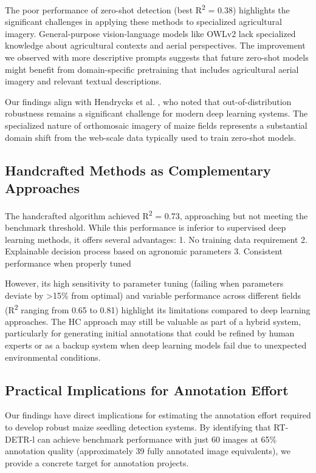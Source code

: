 \documentclass{article}
\begin{document}
The poor performance of zero-shot detection (best R\textsuperscript{2} = 0.38) highlights the significant challenges in applying these methods to specialized agricultural imagery. General-purpose vision-language models like OWLv2 lack specialized knowledge about agricultural contexts and aerial perspectives. The improvement we observed with more descriptive prompts suggests that future zero-shot models might benefit from domain-specific pretraining that includes agricultural aerial imagery and relevant textual descriptions.

Our findings align with Hendrycks et al. \cite{hendrycksManyFacesRobustness2020}, who noted that out-of-distribution robustness remains a significant challenge for modern deep learning systems. The specialized nature of orthomosaic imagery of maize fields represents a substantial domain shift from the web-scale data typically used to train zero-shot models.

\subsection{Handcrafted Methods as Complementary Approaches}

The handcrafted algorithm achieved R\textsuperscript{2} = 0.73, approaching but not meeting the benchmark threshold. While this performance is inferior to supervised deep learning methods, it offers several advantages:
1. No training data requirement
2. Explainable decision process based on agronomic parameters
3. Consistent performance when properly tuned

However, its high sensitivity to parameter tuning (failing when parameters deviate by >15\% from optimal) and variable performance across different fields (R\textsuperscript{2} ranging from 0.65 to 0.81) highlight its limitations compared to deep learning approaches. The HC approach may still be valuable as part of a hybrid system, particularly for generating initial annotations that could be refined by human experts or as a backup system when deep learning models fail due to unexpected environmental conditions.

\subsection{Practical Implications for Annotation Effort}

Our findings have direct implications for estimating the annotation effort required to develop robust maize seedling detection systems. By identifying that RT-DETR-l can achieve benchmark performance with just 60 images at 65\% annotation quality (approximately 39 fully annotated image equivalents), we provide a concrete target for annotation projects.
\end{document}
